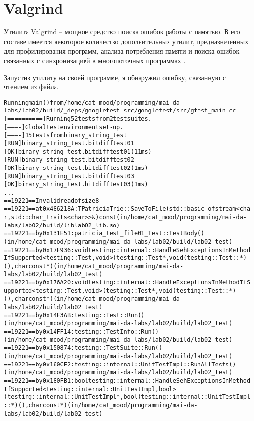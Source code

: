 \section{Valgrind}
Утилита Valgrind -- мощное средство поиска ошибок работы с
памятью. В его составе имеется некоторое количество
дополнительных утилит, предназначенных для профилирования программ,
анализа потребления памяти и поиска ошибок связанных с синхронизацией в
многопоточных программах \cite{Valgrind}.

Запустив утилиту на своей программе, я обнаружил ошибку, связанную с чтением из файла.

\begin{alltt}
Running main() from /home/cat_mood/programming/mai-da-labs/lab02/build/_deps/googletest-src/googletest/src/gtest_main.cc
[==========] Running 52 tests from 2 test suites.
[----------] Global test environment set-up.
[----------] 15 tests from binary_string_test
[ RUN      ] binary_string_test.bitdifftest01
[       OK ] binary_string_test.bitdifftest01 (11 ms)
[ RUN      ] binary_string_test.bitdifftest02
[       OK ] binary_string_test.bitdifftest02 (1 ms)
[ RUN      ] binary_string_test.bitdifftest03
[       OK ] binary_string_test.bitdifftest03 (1 ms)
...
==19221== Invalid read of size 8
==19221==    at 0x486218A: TPatriciaTrie::SaveToFile(std::basic_ofstream<char, std::char_traits<char> >&) const (in /home/cat_mood/programming/mai-da-labs/lab02/build/liblab02_lib.so)
==19221==    by 0x131E51: patricia_test_file01_Test::TestBody() (in /home/cat_mood/programming/mai-da-labs/lab02/build/lab02_test)
==19221==    by 0x17F936: void testing::internal::HandleSehExceptionsInMethodIfSupported<testing::Test, void>(testing::Test*, void (testing::Test::*)(), char const*) (in /home/cat_mood/programming/mai-da-labs/lab02/build/lab02_test)
==19221==    by 0x176A20: void testing::internal::HandleExceptionsInMethodIfSupported<testing::Test, void>(testing::Test*, void (testing::Test::*)(), char const*) (in /home/cat_mood/programming/mai-da-labs/lab02/build/lab02_test)
==19221==    by 0x14F3AB: testing::Test::Run() (in /home/cat_mood/programming/mai-da-labs/lab02/build/lab02_test)
==19221==    by 0x14FF14: testing::TestInfo::Run() (in /home/cat_mood/programming/mai-da-labs/lab02/build/lab02_test)
==19221==    by 0x150874: testing::TestSuite::Run() (in /home/cat_mood/programming/mai-da-labs/lab02/build/lab02_test)
==19221==    by 0x160CE2: testing::internal::UnitTestImpl::RunAllTests() (in /home/cat_mood/programming/mai-da-labs/lab02/build/lab02_test)
==19221==    by 0x180FB1: bool testing::internal::HandleSehExceptionsInMethodIfSupported<testing::internal::UnitTestImpl, bool>(testing::internal::UnitTestImpl*, bool (testing::internal::UnitTestImpl::*)(), char const*) (in /home/cat_mood/programming/mai-da-labs/lab02/build/lab02_test)

\end{alltt}
